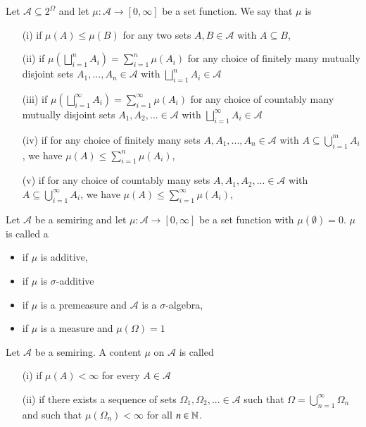\documentclass[12pt, a4paper, oneside, openright, titlepage]{book}
\begin{document}
\begin{defn}
    Let $\mathcal{A} \subseteq 2^{\Omega}$ and let $\mu:\mathcal{A}\rightarrow [0,\infty]$ be a set function. We say that $\mu$ is \begin{itemize}
        \item[(i)]  if $\mu(A) \leq \mu(B)$ for any two sets $A,B\in\mathcal{A}$ with $A\subseteq B$,
        \item[(ii)]  if $\mu\left(\bigsqcup_{i=1}^nA_i\right) = \sum_{i=1}^n\mu(A_i)$ for any choice of finitely many mutually disjoint sets $A_1,...,A_n \in \mathcal{A}$ with $\bigsqcup_{i=1}^nA_i \in \mathcal{A}$
        \item[(iii)]  if $\mu\left(\bigsqcup_{i=1}^{\infty}A_i\right) = \sum_{i=1}^{\infty}\mu(A_i)$ for any choice of countably many mutually disjoint sets $A_1,A_2,... \in \mathcal{A}$ with $\bigsqcup_{i=1}^{\infty}A_i \in \mathcal{A}$
        \item[(iv)]  if for any choice of finitely many sets $A,A_1,...,A_n \in \mathcal{A}$ with $A \subseteq \bigcup_{i=1}^mA_i$, we have $\mu(A) \leq \sum_{i=1}^n\mu(A_i)$, 
        \item[(v)]  if for any choice of countably many sets $A,A_1,A_2,... \in \mathcal{A}$ with $A \subseteq \bigcup_{i=1}^{\infty}A_i$, we have $\mu(A) \leq \sum_{i=1}^{\infty}\mu(A_i)$,
    \end{itemize}
\end{defn}


\begin{defn}
    Let $\mathcal{A}$ be a semiring and let $\mu:\mathcal{A}\rightarrow [0,\infty]$ be a set function with $\mu(\emptyset) = 0$. $\mu$ is called a \begin{itemize}
        \item {} if $\mu$ is additive,
        \item {} if $\mu$ is $\sigma$-additive
        \item {} if $\mu$ is a premeasure and $\mathcal{A}$ is a $\sigma$-algebra, 
        \item {} if $\mu$ is a measure and $\mu(\Omega) = 1$
    \end{itemize}
\end{defn}

\begin{defn}
    Let $\mathcal{A}$ be a semiring. A content $\mu$ on $\mathcal{A}$ is called \begin{itemize}
        \item[(i)]  if $\mu(A) < \infty$ for every $A \in \mathcal{A}$
        \item[(ii)]  if there exists a sequence of sets $\Omega_1,\Omega_2,... \in \mathcal{A}$ such that $\Omega = \bigcup_{n=1}^{\infty}\Omega_n$ and such that $\mu(\Omega_n) < \infty$ for all $n \in \mathbb N$.
    \end{itemize}
\end{defn}
\end{document}

